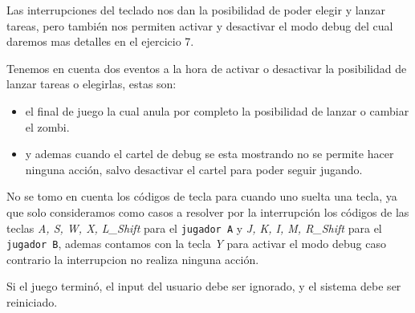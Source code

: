 	Las interrupciones del teclado nos dan la posibilidad de poder elegir y lanzar tareas, pero también nos permiten activar y desactivar el modo debug del cual daremos mas detalles en el ejercicio 7.

	Tenemos en cuenta dos eventos a la hora de activar o desactivar la posibilidad de lanzar tareas o elegirlas, estas son: 
	\begin{itemize}
		\item el final de juego la cual anula por completo la posibilidad de lanzar o cambiar el zombi.

		\item y ademas cuando el cartel de debug se esta mostrando no se permite hacer ninguna acción, salvo desactivar el cartel para poder seguir jugando.
	\end{itemize}

	No se tomo en cuenta los códigos de tecla para cuando uno suelta una tecla, ya que solo consideramos como casos a resolver por la interrupción los códigos de las teclas \textit{A, S, W, X, L\_Shift} para el \texttt{jugador A} y \textit{J, K, I, M, R\_Shift} para el \texttt{jugador B}, ademas contamos con la tecla \textit{Y} para activar el modo debug caso contrario la interrupcion no realiza ninguna acción.

    Si el juego terminó, el input del usuario debe ser ignorado, y el sistema debe ser reiniciado.